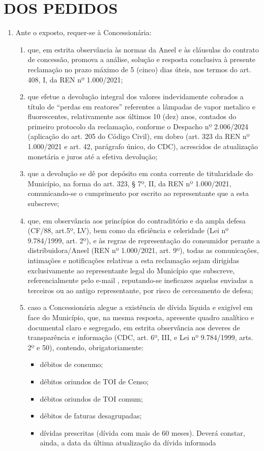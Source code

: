 \section{DOS PEDIDOS}

\begin{enumerate}[resume]

\item
Ante o exposto, requer-se à Concessionária: 

\begin{enumerate}
    \item que, em estrita observância às normas da Aneel e às cláusulas do contrato de concessão, promova a análise, solução e resposta conclusiva à presente reclamação no prazo máximo de 5 (cinco) dias úteis, nos termos do art. 408, I, da REN nº 1.000/2021;
    \item  que efetue a devolução integral dos valores indevidamente cobrados a título de “perdas em reatores” referentes a lâmpadas de vapor metalico e fluorescentes, relativamente aos últimos 10 (dez) anos, contados do primeiro protocolo da reclamação, conforme o Despacho nº 2.006/2024 (aplicação do art. 205 do Código Civil), em dobro (art. 323 da REN nº 1.000/2021 e art. 42, parágrafo único, do CDC), acrescidos de atualização monetária e juros até a efetiva devolução; 
    \item que a devolução se dê por depósito em conta corrente de titularidade do Município, na forma do art. 323, § 7º, II, da REN nº 1.000/2021, comunicando-se o cumprimento por escrito ao representante que a esta subscreve; 
    \item que, em observância aos princípios do contraditório e da ampla defesa (CF/88, art.5º, LV), bem como da eficiência e celeridade (Lei nº 9.784/1999, art. 2º), e às regras de representação do consumidor perante a distribuidora/Aneel (REN nº 1.000/2021, art. 9º), todas as comunicações, intimações e notificações relativas a esta reclamação sejam dirigidas exclusivamente ao representante legal do Município que subscreve, referencialmente pelo e-mail \emailEmpresa{} , reputando-se ineficazes aquelas enviadas a terceiros ou ao antigo representante, por risco de cerceamento de defesa;
    \item caso a Concessionária alegue a existência de dívida líquida e exigível em face do Município, que, na mesma resposta, apresente quadro analítico e documental claro e segregado, em estrita observância aos deveres de transparência e informação (CDC, art. 6º, III, e Lei nº 9.784/1999, arts. 2º e 50), contendo, obrigatoriamente: 
    \begin{itemize}
        \item débitos de consumo; 
        \item débitos oriundos de TOI de Censo;
        \item débitos oriundos de TOI comum; 
        \item débitos de faturas desagrupadas; 
        \item dívidas prescritas (dívida com mais de 60 meses). Deverá constar, ainda, a data da última atualização da dívida informada 
    \end{itemize}
\end{enumerate}


\end{enumerate}